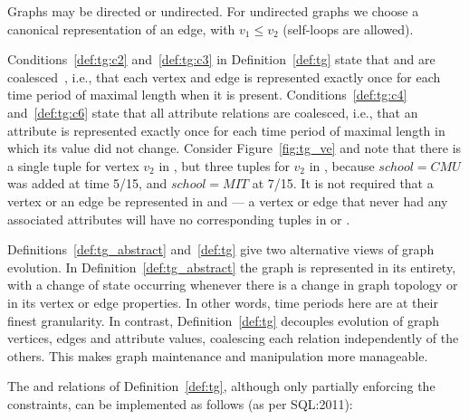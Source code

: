 Graphs may be directed or undirected.  For undirected graphs we choose
a canonical representation of an edge, with $v_1 \leq v_2$ (self-loops
are allowed).

Conditions~\ref{def:tg:c2} and~\ref{def:tg:c3} in
Definition~\ref{def:tg} state that \tv and \te are
coalesced~\cite{DBLP:conf/vldb/BohlenSS96}, i.e., that each vertex and
edge is represented exactly once for each time period of maximal
length when it is present.  Conditions~\ref{def:tg:c4}
and~\ref{def:tg:c6} state that all attribute relations are coalesced,
i.e., that an attribute is represented exactly once for each time
period of maximal length in which its value did not change.  Consider
Figure~\ref{fig:tg_ve} and note that there is a single tuple for
vertex $v_2$ in \tv, but three tuples for $v_2$ in \tav, because
$school=CMU$ was added at time 5/15, and $school=MIT$ at 7/15.  It is
not required that a vertex or an edge be represented in \tav and \tae
--- a vertex or edge that never had any associated attributes will
have no corresponding tuples in \tav or \tae.

Definitions~\ref{def:tg_abstract} and~\ref{def:tg} give two
alternative views of graph evolution.  In
Definition~\ref{def:tg_abstract} the graph is represented in its
entirety, with a change of state occurring whenever there is a change
in graph topology or in its vertex or edge properties.  In other
words, time periods here are at their finest granularity.  In
contrast, Definition~\ref{def:tg} decouples evolution of graph
vertices, edges and attribute values, coalescing each relation
independently of the others.  This makes graph maintenance and
manipulation more manageable.

The \tv and \te relations of Definition~\ref{def:tg}, although only
partially enforcing the constraints, can be implemented as follows (as
per SQL:2011):


